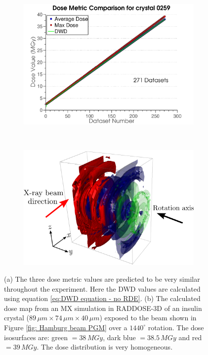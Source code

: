 \begin{figure}
        \centering
        \begin{subfigure}[b]{1\textwidth}
                \centering
                \includegraphics[width=\textwidth]{figures/dwd/metrics.pdf}
                \caption{}
                \label{fig:Metrics}
        \end{subfigure}
				\\
        \begin{subfigure}[b]{1\textwidth}
                \centering
                \includegraphics[width=\textwidth]{figures/dwd/raddose3d.png}
                \caption{}
                \label{fig:RADDOSE-3D dose contours uniform irradiation}
        \end{subfigure}
        \caption{(a) The three dose metric values are predicted to be very similar throughout the experiment.
        Here the DWD values are calculated using equation \ref{eq:DWD equation - no RDE}.
        (b) The calculated dose map from an MX simulation in RADDOSE-3D of an insulin crystal ($89\,\mu m \times 74\,\mu m \times 40\,\mu m$) exposed to the beam shown in Figure \ref{fig: Hamburg beam PGM} over a $1440^{\circ}$ rotation. The dose isosurfaces are: green $= 38\, MGy$, dark blue $= 38.5\, MGy$ and red $= 39\, MGy$. The dose distribution is very homogeneous.}
        \label{fig:Uniform}
\end{figure}

